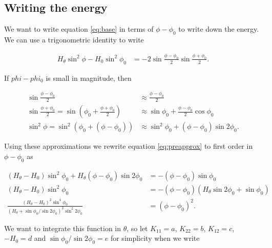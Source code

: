 \subsection{Writing the energy}

We want to write equation \ref{eq:base} in terms of $\phi-\phi_0$ to write down the energy. We can use a trigonometric identity to write

\begin{align}
    H_\theta \sin^2\phi - H_0 \sin^2\phi_0 &= -2 \sin \frac{\phi - \phi_0}{2} \sin\frac{\phi + \phi_0}{2}. \label{eq:preapprox}
\end{align}

\noindent If $phi - phi_0$ is small in magnitude, then 

\begin{align*}
    \sin\frac{\phi - \phi_0}{2} &\approx \frac{\phi - \phi_0}{2} \\
    \sin\frac{\phi + \phi_0}{2} = \sin\left(\phi_0 + \frac{\phi + \phi_0}{2} \right) &\approx \sin\phi_0 + \frac{\phi - \phi_0}{2} \cos\phi_0 \\
    \sin^2\phi = \sin^2\left(\phi_0 + (\phi - \phi_0) \right) &\approx \sin^2\phi_0 +(\phi - \phi_0)\sin2\phi_0.
\end{align*}

Using these approximations we rewrite equation \ref{eq:preapprox} to first order in $\phi - \phi_0$ as

\begin{align*}
    (H_\theta - H_0) \sin^2\phi_0 + H_\theta (\phi - \phi_0)\sin2\phi_0 &= -(\phi - \phi_0) \sin\phi_0 \\
    (H_\theta - H_0) \sin^2\phi_0 &= -(\phi-\phi_0) (H_\theta \sin2\phi_0 + \sin\phi_0) \\
    \frac{(H_\theta-H_0)^2 \sin^4\phi_0}{(H_\theta + \sin\phi_0 / \sin2\phi_0)^2 \sin^2 2\phi_0} &= (\phi - \phi_0)^2.
\end{align*}

We want to integrate this function in $\theta$, so let $K_{11} = a$, $K_{22} = b$, $K_{12} = c$, $-H_0 = d$ and $\sin\phi_0/ \sin 2 \phi_0 = e$ for simplicity when we write

